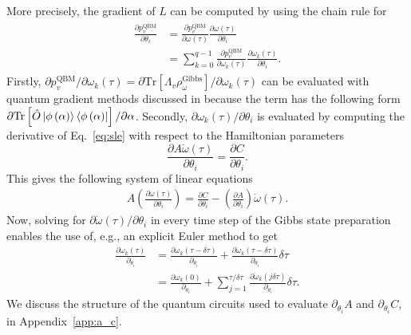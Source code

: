 \documentclass[twocolumn, aps, pra, superscriptaddress, floatfix]{revtex4}
\begin{document}
More precisely, the gradient of $L$  can be computed by using the chain rule for
\begin{align}
\label{eq:gradGibbsState}
\begin{split}
	\frac{\partial p_v^{\text{QBM}}}{\partial\theta_i}  &=  
	 \frac{\partial  p_v^{\text{QBM}}}{\partial\omega\left(\tau\right)}\frac{\partial\omega\left(\tau\right)}{\partial\theta_i} \\
	 &=\sum\limits_{k=0}^{q-1} \frac{\partial  p_v^{\text{QBM}} }{\partial\omega_k\left(\tau\right)}\frac{\partial\omega_k\left(\tau\right)}{\partial\theta_i}.
	 \end{split}
\end{align}
Firstly, $\partial  p_v^{\text{QBM}}/\partial\omega_k\left(\tau\right)=\partial \text{Tr}\left[\Lambda_v\rho_{\omega}^{\text{Gibbs}}\right] / \partial\omega_k\left(\tau\right)$ can be evaluated with quantum gradient methods discussed in \cite{Farhi2018_gradients, Fujii2018_qcircuitLearn,killoran2018, SchuldQuantumGradients19, Zoufal2019} because the term has the following form $\partial \text{Tr}\left[\hat{O}\ket{\phi\left(\alpha\right)}\bra{\phi\left(\alpha\right)}\right] / \partial\alpha$.
Secondly, ${\partial\omega_k\left(\tau\right)}/{\partial\theta_i}$ is evaluated by computing the derivative of Eq.~\eqref{eq:sle} with respect to the Hamiltonian parameters
\begin{equation*} 
				 \frac{\partial A\dot{\omega}\left(\tau\right)}{\partial{\theta_i}} = \frac{\partial  C}{\partial{\theta_i}}.
\end{equation*}
This gives the following system of linear equations
\begin{align}
\label {eq:sle_derivative}
         A\left(\frac{\partial\dot{\omega}\left(\tau\right)}{\partial{\theta_i}}\right) = \frac{\partial C}{\partial{\theta_i}} - \left(\frac{\partial A}{\partial{\theta_i}}\right)\dot{\omega}\left(\tau\right).
\end{align}
Now, solving for $\partial\dot{\omega}\left(\tau\right)/\partial{\theta_i}$ in every time step of the Gibbs state preparation enables the use of, e.g., an explicit Euler method to get
\begin{equation}
\label{eq:omega_derivative}
\begin{split}
	\frac{\partial \omega_k\left(\tau \right)}{\partial_{\theta_i}} &= \frac{\partial\omega_k\left(\tau-\delta\tau\right)}{\partial_{\theta_i}}+\frac{\partial\dot{\omega}_k\left(\tau-\delta\tau\right)}{\partial_{\theta_i}}\delta\tau    \\
	&=\frac{\partial \omega_k\left(0\right)}{\partial_{\theta_i}} + \sum\limits_{j=1}^{\tau/\delta\tau}\frac{\partial \dot{\omega}_k\left(j\delta\tau\right)}{\partial_{\theta_i}}\delta\tau.
\end{split}
\end{equation}	
We discuss the structure of the quantum circuits used to evaluate $\partial_{\theta_i}A$ and $\partial_{\theta_i}C$, in Appendix~\ref{app:a_c}.
\end{document}
